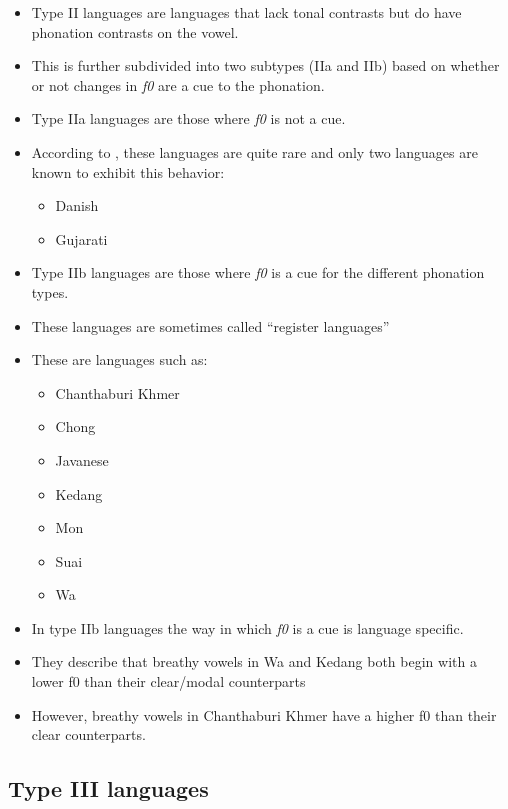 \begin{itemize}
    \item Type II languages are languages that lack tonal contrasts but do have phonation contrasts on the vowel. 
    \item This is further subdivided into two subtypes (IIa and IIb) based on whether or not changes in \textit{f0} are a cue to the phonation. 
    \item Type IIa languages are those where \textit{f0} is not a cue. 
    \item According to \citet{espositoCrossLinguisticPatterns2020}, these languages are quite rare and only two languages are known to exhibit this behavior: 
    \begin{itemize}
        \item Danish \citep{gronnumDanishStodLaryngealization2013}
        \item Gujarati \citep{khanPhoneticsContrastivePhonation2012}
    \end{itemize} 
    \item Type IIb languages are those where \textit{f0} is a cue for the different phonation types.
    \item These languages are sometimes called ``register languages''
    \item These are languages such as: 
    \begin{itemize}
        \item Chanthaburi Khmer
        \item Chong 
        \item Javanese
        \item Kedang
        \item Mon
        \item Suai 
        \item Wa
    \end{itemize}
    \item In type IIb languages the way in which \textit{f0} is a cue is language specific. 
    \item They describe that breathy vowels in Wa and Kedang both begin with a lower f0 than their clear/modal counterparts
    \item However, breathy vowels in Chanthaburi Khmer have a higher f0 than their clear counterparts.
\end{itemize}

\subsection{Type III languages} \label{sec:TypeIII}

